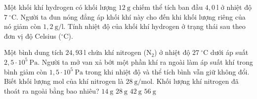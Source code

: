 \begin{ex}
	Một khối khí hydrogen có khối lượng $12\ \mathrm{g}$ chiếm thể tích ban đầu $4,0\ \mathrm{l}$ ở nhiệt độ $7\ ^\circ\mathrm{C}$. Người ta đun nóng đẳng áp khối khí này cho đến khi khối lượng riêng của nó giảm còn $1,2\ \mathrm{g/l}$. Tính nhiệt độ của khối khí hydrogen ở trạng thái sau theo đơn vị độ Celsius ($^\circ\mathrm{C}$).
\end{ex}

\begin{ex}
Một bình dung tích $24,93\ \mathrm{l}$ chứa khí nitrogen ($\mathrm{N_2}$) ở nhiệt độ $27\ ^\circ\mathrm{C}$ dưới áp suất $2,5 \cdot 10^5\ \mathrm{Pa}$. Người ta mở van xả bớt một phần khí ra ngoài làm áp suất khí trong bình giảm còn $1,5 \cdot 10^5\ \mathrm{Pa}$ trong khi nhiệt độ và thể tích bình vẫn giữ không đổi. Biết khối lượng mol của khí nitrogen là $28\ \mathrm{g/mol}$. Khối lượng khí nitrogen đã thoát ra ngoài bằng bao nhiêu?
\choice
{$14\ \mathrm{g}$}
{\True $28\ \mathrm{g}$}
{$42\ \mathrm{g}$}
{$56\ \mathrm{g}$}
\end{ex}

